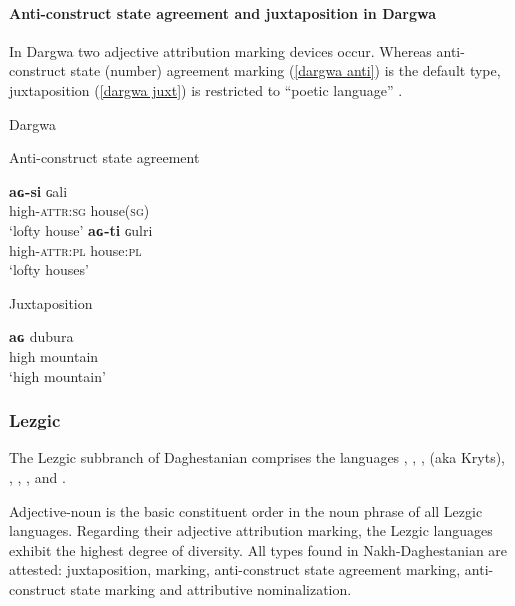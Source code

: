 \paragraph*{Anti\hyp{}construct state agreement and juxtaposition in Dargwa}
In Dargwa two adjective attribution marking devices occur. Whereas anti\hyp{}construct state (number) agreement marking (\ref{dargwa anti}) is the default type, juxtaposition (\ref{dargwa juxt}) is restricted to “poetic language” \citep[318]{isaev2004}.
\begin{exe}
\ex 
\rm{Dargwa \citep[318]{isaev2004}}
\begin{xlist}
\ex 
\label{dargwa anti}
\rm{Anti\hyp{}construct state agreement} 
\begin{xlist}
\ex
\gll	\textbf{aɢ-si} ɢali\\
	high-\textsc{attr:sg} house(\textsc{sg})\\
\glt	‘lofty house’
\ex
\gll	\textbf{aɢ-ti} ɢulri\\
	high-\textsc{attr:pl} house:\textsc{pl}\\
\glt	‘lofty houses’
\end{xlist}

\ex
\label{dargwa juxt}
\rm{Juxtaposition}
\begin{xlist}
\ex
\gll	\textbf{aɢ} dubura\\
	high mountain\\
\glt	‘high mountain’
\end{xlist}
\end{xlist}
\end{exe}

\subsubsection{Lezgic}\label{lezgian synchr}
The Lezgic subbranch of Daghestanian comprises the languages , , ,  (aka Kryts), , , ,  and .

Adjective-noun is the basic constituent order in the noun phrase of all Lezgic languages. Regarding their adjective attribution marking, the Lezgic languages exhibit the highest degree of diversity. All types found in Nakh-Daghestanian are attested: juxtaposition,  marking, anti\hyp{}construct state agreement marking, anti\hyp{}construct state marking and attributive nominalization.

